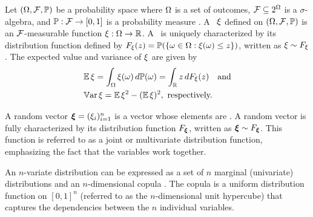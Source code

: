 Let $(\Omega, \mathcal{F}, \mathbb{P})$ be a probability space where $\Omega$ is a set of
outcomes, $\mathcal{F} \subseteq 2^\Omega$ is a $\sigma$-algebra, and
$\mathbb{P}: \mathcal{F} \to [0, 1]$ is a probability measure
\cite{durrett2010}. A \rv\ $\xi$ defined on $(\Omega, \mathcal{F}, \mathbb{P})$ is an
$\mathcal{F}$-measurable function $\xi: \Omega \to \mathbb{R}$. A \rv\ is
uniquely characterized by its distribution function defined by
$F_\xi(z) = \mathbb{P}(\{ \omega \in \Omega: \xi(\omega) \leq z
\})$, written as $\xi \sim F_\xi$. The expected value and variance of
$\xi$ are given by
\begin{align}
  & \expectation{\h} = \int_\outcomes \h(\o) \, \d\probabilityMeasure(\o) = \int_\real z \, \d\distribution_\h(z) \hspace{1em} \text{and} \elab{expectation} \\
  & \variance{\h} = \expectation{\h^2} - (\expectation{\h})^2,\text{ respectively.} \elab{variance}
\end{align}

A random vector $\bm{\xi} = (\xi_i)_{i = 1}^n$ is a vector whose elements are \rvs. A
random vector is fully characterized by its distribution function
$F_{\bm{\xi}}$, written as $\bm{\xi} \sim F_{\bm{\xi}}$. This function
is referred to as a joint or multivariate distribution function, emphasizing the
fact that the variables work together.

An $n$-variate distribution can be expressed as a set of $n$ marginal
(univariate) distributions and an $n$-dimensional copula \cite{nelsen2006}. The
copula is a uniform distribution function on $[0, 1]^n$ (referred to as the
$n$-dimensional unit hypercube) that captures the dependencies between the $n$
individual variables.
